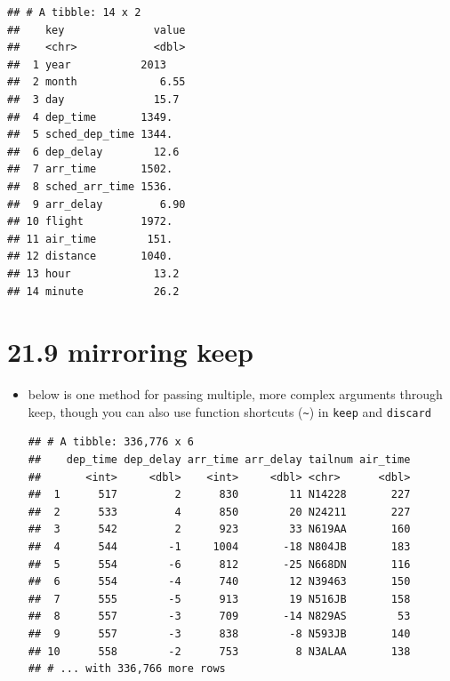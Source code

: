 \documentclass[]{book}
\newenvironment{Shaded}{\begin{snugshade}}{\end{snugshade}}
\newcommand{\CommentTok}[1]{\textcolor[rgb]{0.56,0.35,0.01}{\textit{#1}}}
\newcommand{\DecValTok}[1]{\textcolor[rgb]{0.00,0.00,0.81}{#1}}
\newcommand{\KeywordTok}[1]{\textcolor[rgb]{0.13,0.29,0.53}{\textbf{#1}}}
\newcommand{\NormalTok}[1]{#1}
\newcommand{\OperatorTok}[1]{\textcolor[rgb]{0.81,0.36,0.00}{\textbf{#1}}}
\newcommand{\StringTok}[1]{\textcolor[rgb]{0.31,0.60,0.02}{#1}}
\theoremstyle{definition}
\theoremstyle{definition}
\theoremstyle{definition}
\theoremstyle{remark}
\begin{document}
\begin{verbatim}
## # A tibble: 14 x 2
##    key              value
##    <chr>            <dbl>
##  1 year           2013   
##  2 month             6.55
##  3 day              15.7 
##  4 dep_time       1349.  
##  5 sched_dep_time 1344.  
##  6 dep_delay        12.6 
##  7 arr_time       1502.  
##  8 sched_arr_time 1536.  
##  9 arr_delay         6.90
## 10 flight         1972.  
## 11 air_time        151.  
## 12 distance       1040.  
## 13 hour             13.2 
## 14 minute           26.2
\end{verbatim}

\hypertarget{mirroring-keep}{%
\section{21.9 mirroring keep}\label{mirroring-keep}}

\begin{itemize}
\item
  below is one method for passing multiple, more complex arguments
  through keep, though you can also use function shortcuts
  (\texttt{\textasciitilde{}}) in \texttt{keep} and \texttt{discard}

\begin{Shaded}
\end{Shaded}

\begin{verbatim}
## # A tibble: 336,776 x 6
##    dep_time dep_delay arr_time arr_delay tailnum air_time
##       <int>     <dbl>    <int>     <dbl> <chr>      <dbl>
##  1      517         2      830        11 N14228       227
##  2      533         4      850        20 N24211       227
##  3      542         2      923        33 N619AA       160
##  4      544        -1     1004       -18 N804JB       183
##  5      554        -6      812       -25 N668DN       116
##  6      554        -4      740        12 N39463       150
##  7      555        -5      913        19 N516JB       158
##  8      557        -3      709       -14 N829AS        53
##  9      557        -3      838        -8 N593JB       140
## 10      558        -2      753         8 N3ALAA       138
## # ... with 336,766 more rows
\end{verbatim}
\end{itemize}
\end{document}
